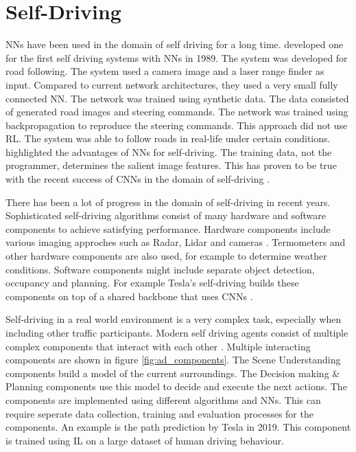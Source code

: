 \section{Self-Driving}

\acp{NN} have been used in the domain of self driving for a long time. \textcite{alvinn} developed one for the first self driving systems with \acp{NN} in 1989. The system was developed for road following. The system used a camera image and a laser range finder as input. Compared to current network architectures, they used a very small fully connected \ac{NN}. The network was trained using synthetic data. The data consisted of generated road images and steering commands. The network was trained using backpropagation to reproduce the steering commands. This approach did not use \ac{RL}. The system was able to follow roads in real-life under certain conditions.
\textcite{alvinn} highlighted the advantages of \acp{NN} for self-driving. The training data, not the programmer, determines the salient image features. This has proven to be true with the recent success of \acp{CNN} in the domain of self-driving \textcite{drl_for_ad}.


There has been a lot of progress in the domain of self-driving in recent years. Sophisticated self-driving algorithms consist of many hardware and software components to achieve satisfying performance. Hardware components include various imaging approches such as Radar, Lidar and cameras \autocite{drl_for_ad}. Termometers and other hardware components are also used, for example to determine weather conditions. 
Software components might include separate object detection, occupancy and planning. For example Tesla's self-driving builds these components on top of a shared backbone that uses \acp{CNN} \autocite{howteslaautopilot}.

Self-driving in a real world environment is a very complex task, especially when including other traffic participants. Modern self driving agents consist of multiple complex components that interact with each other \autocite{drl_for_ad}. Multiple interacting components are shown in figure \ref{fig:ad_components}. The Scene Understanding components build a model of the current surroundings. The Decision making \& Planning components use this model to decide and execute the next actions.
The components are implemented using different algorithms and \acp{NN}. This can require seperate data collection, training and evaluation processes for the components. An example is the path prediction by Tesla \textcite{tesla_youtube} in 2019. This component is trained using \ac{IL} on a large dataset of human driving behaviour.

